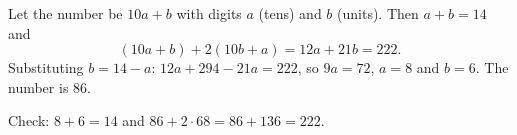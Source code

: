 Let the number be $10a+b$ with digits $a$ (tens) and $b$ (units). Then $a+b=14$ and
\[
(10a+b)+2(10b+a)=12a+21b=222 .
\]
Substituting $b=14-a$: $12a+294-21a=222$, so $9a=72$, $a=8$ and $b=6$. The number is $\boxed{86}$.

Check: $8+6=14$ and $86+2\cdot68=86+136=222$.
